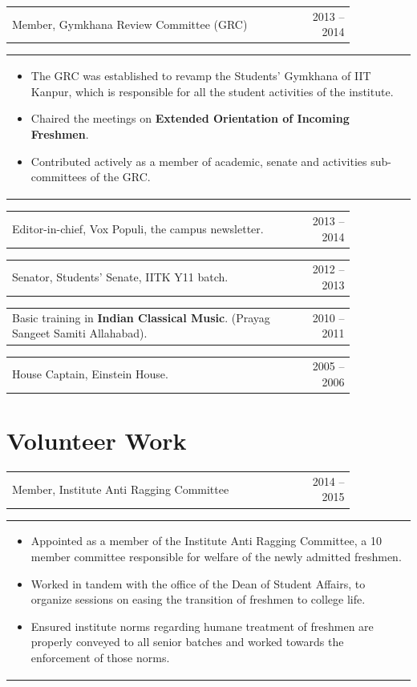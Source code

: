 \documentclass[a4paper,10pt]{article} %
\newcommand{\iproject}[3]{
    \begin{tabular}{p{0.85\linewidth}r}
        \textcolor{NavyBlue}{#2} & \multicolumn{1}{m{3cm}}{\raggedleft \textsc{#1}}\\
    \end{tabular}
    \begin{tabular}{p{\linewidth}}
    \vspace{-0.3cm}
        \footnotesize{#3}
    \end{tabular}
    \vspace{-0.5cm}
}
\newcommand{\skill}[2]{
    \begin{tabular}{p{0.85\linewidth}r}
        #2 & \multicolumn{1}{m{3cm}}{\raggedleft \textsc{#1}}\\
    \end{tabular}
    \vspace{-0.5cm}
}
\begin{document}
\iproject {2013 -- 2014}
          {Member, Gymkhana Review Committee (GRC)}
          {
               \begin{itemize}[leftmargin=0.5cm]
                   \item The GRC was established to revamp the Students' Gymkhana of IIT Kanpur,
                       which is responsible for all the student activities of the institute.
                   \item Chaired the meetings on \textbf{Extended Orientation of Incoming Freshmen}.
                   \item Contributed actively as a member of academic, senate and activities sub-committees of the GRC.
               \end{itemize}
          }

\skill {2013 -- 2014}
       {Editor-in-chief, Vox Populi, the campus newsletter.}

\skill {2012 -- 2013}
       {Senator, Students' Senate, IITK Y11 batch.}

\skill {2010 -- 2011}
       {Basic training in \textbf{Indian Classical Music}. (Prayag Sangeet Samiti Allahabad).}

\skill {2005 -- 2006}
       {House Captain, Einstein House.}


\section{Volunteer Work}

\iproject {2014 -- 2015}
          {Member, Institute Anti Ragging Committee}
          {
               \begin{itemize}[leftmargin=0.5cm]
                   \item Appointed as a member of the Institute Anti Ragging Committee, a 10 member committee responsible
                       for welfare of the newly admitted freshmen.
                   \item Worked in tandem with the office of the Dean of Student Affairs, to organize sessions
                       on easing the transition of freshmen to college life.
                   \item Ensured institute norms regarding humane treatment of freshmen are properly conveyed to all senior batches
                       and worked towards the enforcement of those norms.
               \end{itemize}
          }
\end{document}
